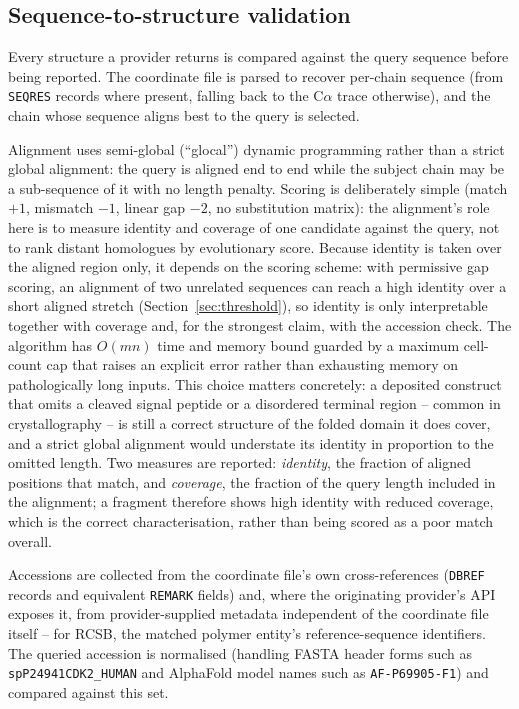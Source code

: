 \subsection{Sequence-to-structure validation}
\label{sec:validation}

Every structure a provider returns is compared against the query sequence
before being reported. The coordinate file is parsed to recover per-chain
sequence (from \texttt{SEQRES} records where present, falling back to the
$\text{C}\alpha$ trace otherwise), and the chain whose sequence aligns best
to the query is selected.

Alignment uses semi-global (``glocal'') dynamic programming rather than a
strict global alignment: the query is aligned end to end while the subject
chain may be a sub-sequence of it with no length penalty. Scoring is
deliberately simple (match $+1$, mismatch $-1$, linear gap $-2$, no
substitution matrix): the alignment's role here is to measure identity and
coverage of one candidate against the query, not to rank distant homologues
by evolutionary score. Because identity is taken over the aligned region only, it
depends on the scoring scheme: with permissive gap scoring, an alignment of two
unrelated sequences can reach a high identity over a short aligned stretch
(Section~\ref{sec:threshold}), so identity is only interpretable together with
coverage and, for the strongest claim, with the accession check. The algorithm has $O(mn)$ time and memory bound guarded by a maximum
cell-count cap that raises an explicit error rather than exhausting memory
on pathologically long inputs. This choice matters concretely: a deposited
construct that omits a cleaved signal peptide or a disordered terminal
region -- common in crystallography -- is still a correct structure of the
folded domain it does cover, and a strict global alignment
\citep{needleman1970} would understate its identity in proportion to the
omitted length. Two measures are reported: \emph{identity}, the fraction of
aligned positions that match, and \emph{coverage}, the fraction of the query
length included in the alignment; a fragment therefore shows high identity
with reduced coverage, which is the correct characterisation, rather than
being scored as a poor match overall.

Accessions are collected from the coordinate file's own cross-references
(\texttt{DBREF} records and equivalent \texttt{REMARK} fields) and, where
the originating provider's API exposes it, from provider-supplied metadata
independent of the coordinate file itself -- for RCSB, the matched polymer
entity's reference-sequence identifiers. The queried accession is
normalised (handling FASTA header forms such as
\texttt{sp\textbar P24941\textbar CDK2\_HUMAN} and AlphaFold model names such
as \texttt{AF-P69905-F1}) and compared against this set.

